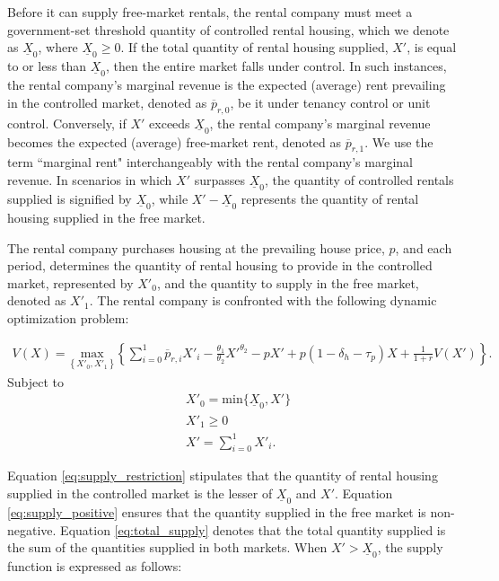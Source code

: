 \documentclass[parskip=full]{article}
\begin{document}
Before it can supply free-market rentals, the rental company must meet a government-set threshold quantity of controlled rental housing, which we denote as $\underline{X}_{0}$, where $\underline{X}_{0} \geq 0$. If the total quantity of rental housing supplied, $X'$, is equal to or less than $\underline{X}_{0}$, then the entire market falls under control. In such instances, the rental company's marginal revenue is the expected (average) rent prevailing in the controlled market, denoted as $\overline{p}_{r,0}$, be it under tenancy control or unit control. Conversely, if $X'$ exceeds $\underline{X}_{0}$, the rental company's marginal revenue becomes the expected (average) free-market rent, denoted as $\overline{p}_{r,1}$. We use the term ``marginal rent" interchangeably with the rental company's marginal revenue. In scenarios in which $X'$ surpasses $\underline{X}_{0}$, the quantity of controlled rentals supplied is signified by $\underline{X}_{0}$, while $X'-\underline{X}_{0}$ represents the quantity of rental housing supplied in the free market.

The rental company purchases housing at the prevailing house price, $p$, and each period, determines the quantity of rental housing to provide in the controlled market, represented by $X'_{0}$, and the quantity to supply in the free market, denoted as $X'_{1}$. The rental company is confronted with the following dynamic optimization problem:

\begin{align}\label{eq:rental_company_problem}
V(X)=\underset{\left\{X'_{0},X'_{1}\right\}} {\text{$\mbox{max} $}}\left\{\sum_{i=0}^{1} \overline{p}_{r,i}X'_{i}-\frac{\theta_{1}}{\theta_{2}}X'^{\theta_{2}}-p X'+p(1-\delta_{h}-\tau_{p})X+\frac{1}{1+r}V(X')\right\}.
\end{align}
Subject to
\begin{align}
& X'_{0}=\mbox{min}\{\underline{X}_{0},X'\} \label{eq:supply_restriction} \\
& X'_{1} \geq 0 \label{eq:supply_positive} \\
& X'=\sum^{1}_{i=0} X'_{i}. \label{eq:total_supply} 
\end{align}

\noindent Equation \eqref{eq:supply_restriction} stipulates that the quantity of rental housing supplied in the controlled market is the lesser of $\underline{X}_{0}$ and $X'$. Equation \eqref{eq:supply_positive} ensures that the quantity supplied in the free market is non-negative. Equation \eqref{eq:total_supply} denotes that the total quantity supplied is the sum of the quantities supplied in both markets. When $X'>\underline{X}_{0}$, the supply function is expressed as follows:
\end{document}
